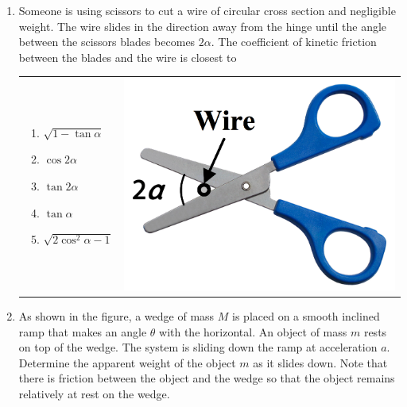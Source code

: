 \documentclass[12pt,letterpaper]{article}
\begin{document}
\begin{enumerate}[resume]
\item
Someone is using scissors to cut a wire of circular cross section and negligible weight. The wire slides in the direction away from the hinge until the angle between the scissors blades becomes $2\alpha$. The coefficient of kinetic friction between the blades and the wire is closest to

\begin{tabular}{l r}

\begin{minipage}{0.65\textwidth}
\begin{enumerate}
\item $\sqrt{1-\tan\alpha}$
\item $\cos{2\alpha}$
\item $\tan{2\alpha}$
\item $\tan\alpha$
\item $\sqrt{2\cos^2\alpha - 1}$
\end{enumerate}
\end{minipage} &
\begin{minipage}{0.25\textwidth}
\includegraphics[width=\textwidth,left]{scissors.png}
\end{minipage}
\end{tabular}

\item
As shown in the figure, a wedge of mass $M$ is placed on a smooth inclined ramp that makes an angle $\theta$ with the horizontal. An object of mass $m$ rests on top of the wedge. The system is sliding down the ramp at acceleration $a$. Determine the apparent weight of the object $m$ as it slides down. Note that there is friction between the object and the wedge so that the object remains relatively at rest on the wedge.


\end{enumerate}
\end{document}

